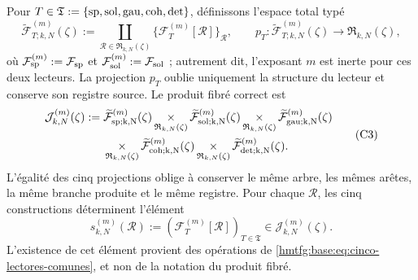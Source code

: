 Pour
\(T\in\mathfrak T:=\{{\rm sp},{\rm sol},{\rm gau},{\rm coh},{\rm det}\}\),
définissons l'espace total typé
\[
 \widetilde{\mathcal F}_{T;k,N}^{(m)}(\zeta)
 :=\coprod_{\mathscr R\in\mathfrak R_{k,N}(\zeta)}
   \{\mathcal F_T^{(m)}[\mathscr R]\}_{\mathscr R},
 \qquad
 p_T:\widetilde{\mathcal F}_{T;k,N}^{(m)}(\zeta)
      \longrightarrow\mathfrak R_{k,N}(\zeta),
\]
où \(\mathcal F_{\rm sp}^{(m)}:=\mathcal F_{\rm sp}\) et \(\mathcal F_{\rm sol}^{(m)}:=\mathcal F_{\rm sol}\) ; autrement dit, l'exposant \(m\) est inerte pour ces deux lecteurs. La projection \(p_T\) oublie uniquement la structure du lecteur et conserve son registre source. Le produit fibré correct est
\[
\begin{aligned}
 \mathcal J_{k,N}^{(m)}(\zeta):={}&
 \widetilde{\mathcal F}_{\rm sp;k,N}^{(m)}(\zeta)
 \mathop{\times}_{\mathfrak R_{k,N}(\zeta)}
 \widetilde{\mathcal F}_{\rm sol;k,N}^{(m)}(\zeta)
 \mathop{\times}_{\mathfrak R_{k,N}(\zeta)}
 \widetilde{\mathcal F}_{\rm gau;k,N}^{(m)}(\zeta)\\
 &\mathop{\times}_{\mathfrak R_{k,N}(\zeta)}
 \widetilde{\mathcal F}_{\rm coh;k,N}^{(m)}(\zeta)
 \mathop{\times}_{\mathfrak R_{k,N}(\zeta)}
 \widetilde{\mathcal F}_{\rm det;k,N}^{(m)}(\zeta).
\end{aligned}
\tag{C3}
\label{hmtfg:base:eq:constructor-correlativo}
\]
L'égalité des cinq projections oblige à conserver le même arbre, les
mêmes arêtes, la même branche produite et le même registre. Pour chaque
\(\mathscr R\), les cinq constructions déterminent l'élément
\[
 s_{k,N}^{(m)}(\mathscr R)
 :=(\mathcal F_T^{(m)}[\mathscr R])_{T\in\mathfrak T}
 \in\mathcal J_{k,N}^{(m)}(\zeta).
\]
L'existence de cet élément provient des opérations de \eqref{hmtfg:base:eq:cinco-lectores-comunes}, et non de la notation du produit fibré.

